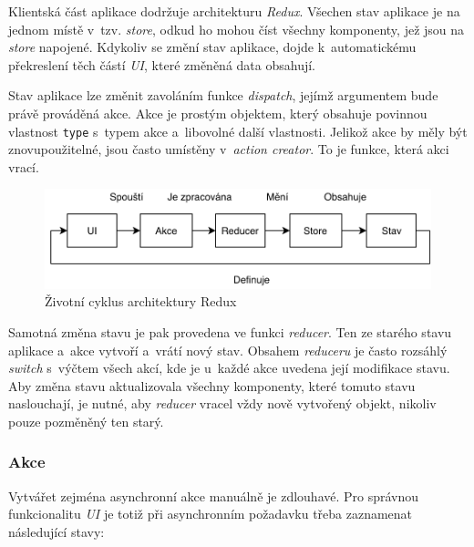 \documentclass[a4paper,12pt]{article}
\def\code#1{\texttt{#1}}
\begin{document}
Klientská část aplikace dodržuje architekturu \textit{Redux}. Všechen stav aplikace je na jednom místě v~tzv. \textit{store}, odkud ho mohou číst všechny komponenty, jež jsou na \textit{store} napojené. Kdykoliv se změní stav aplikace, dojde k~automatickému překreslení těch částí \textit{UI}, které změněná data obsahují.~\cite{reactbook}

Stav aplikace lze změnit zavoláním funkce \textit{dispatch}, jejímž argumentem bude právě prováděná akce. Akce je prostým objektem, který obsahuje povinnou vlastnost \code{type} s~typem akce a~libovolné další vlastnosti. Jelikož akce by měly být znovupoužitelné, jsou často umístěny v~\textit{action creator}. To je funkce, která akci vrací.~\cite{reactbook}

\begin{figure}[H]
\begin{center}
\includegraphics[width=350pt]{Images/Redux.png}
\caption[Životní cyklus architektury Redux]{Životní cyklus architektury Redux \footnotemark}
\end{center}
\end{figure}


Samotná změna stavu je pak provedena ve funkci \textit{reducer}. Ten ze starého stavu aplikace a~akce vytvoří a~vrátí nový stav.  Obsahem \textit{reduceru} je často rozsáhlý \textit{switch} s~výčtem všech akcí, kde je u~každé akce uvedena její modifikace stavu. Aby změna stavu aktualizovala všechny komponenty, které tomuto stavu naslouchají, je nutné, aby \textit{reducer} vracel vždy nově vytvořený objekt, nikoliv pouze pozměněný ten starý.~\cite{reactbook}



\subsubsection{Akce}

Vytvářet zejména asynchronní akce manuálně je zdlouhavé. Pro správnou funkcionalitu \textit{UI} je totiž při asynchronním požadavku třeba zaznamenat následující stavy:
\end{document}
